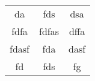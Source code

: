 \begin{tabular}{ c c c }
    da & fds & dsa \\ 
    fdfa & fdfas & dffa \\ 
    fdasf & fda & dasf \\ 
    fd & fds & fg \\ 
\end{tabular}
